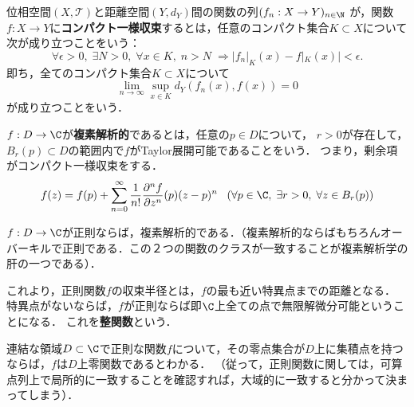 \documentclass[uplatex, dvipdfmx]{jsreport}
\begin{document}
\begin{definition}
    位相空間$(X,\mathcal{T})$と距離空間$(Y,d_Y)$間の関数の列$(f_n:X\to Y)_{n\in\N}$
    が，関数$f:X\to Y$に\textbf{コンパクト一様収束}するとは，任意のコンパクト集合$K\subset X$について次が成り立つことをいう：
    \[ \forall\epsilon>0,\;\exists N>0,\;\forall x\in K,\;n>N\;\Rightarrow |f_n|_K(x)-f|_K(x)|<\epsilon.  \]
    即ち，全てのコンパクト集合$K\subset X$について
    \[\lim_{n\to\infty}\sup_{x\in K}d_Y(f_n(x),f(x))=0 \]
    が成り立つことをいう．
\end{definition}

\begin{definition}[analytic]
    $f:D\to\C$が\textbf{複素解析的}であるとは，任意の$p\in D$について，
    $r>0$が存在して，$B_r(p)\subset D$の範囲内で$f$がTaylor展開可能であることをいう．
    つまり，剰余項がコンパクト一様収束をする．
    \[ f(z) = f(p) + \sum^{\infty}_{n=0}\frac{1}{n!}\frac{\partial^nf}{\partial z^n}(p)(z-p)^n\;\;\;(\forall p\in\C,\;\exists r>0,\;\forall z\in B_r(p)) \]
\end{definition}

\begin{theorem}[正則関数は解析的である]
    $f:D\to\C$が正則ならば，複素解析的である．（複素解析的ならばもちろんオーバーキルで正則である．この２つの関数のクラスが一致することが複素解析学の肝の一つである）．
\end{theorem}
\begin{definition}
    これより，正則関数$f$の収束半径とは，$f$の最も近い特異点までの距離となる．
    特異点がないならば，$f$が正則ならば即$\C$上全ての点で無限解微分可能ということになる．
    これを\textbf{整関数}という．
\end{definition}
\begin{corollary}
    連結な領域$D\subset\C$で正則な関数$f$について，その零点集合が$D$上に集積点を持つならば，$f$は$D$上零関数であるとわかる．
    （従って，正則関数に関しては，可算点列上で局所的に一致することを確認すれば，大域的に一致すると分かって決まってしまう）．
\end{corollary}
\end{document}
